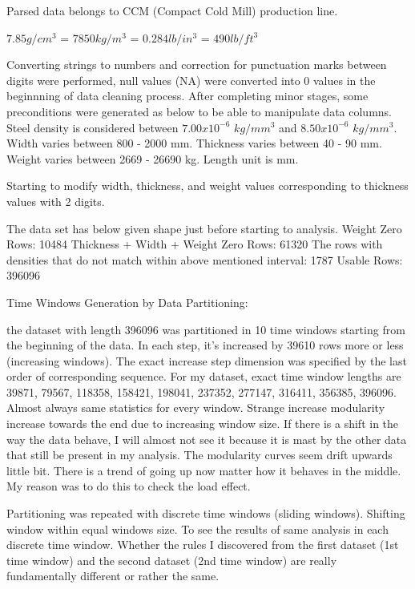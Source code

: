 \documentclass{article}
\begin{document}
Parsed data belongs to CCM (Compact Cold Mill) production line.

$7.85 g/cm^{3}$ = $7850 kg/m^{3}$ = $0.284 lb/in^{3}$ = $490 lb/ft^{3}$

Converting strings to numbers and correction for punctuation marks between digits were performed, null values (NA) were converted into $0$ values in the beginnning of data cleaning process. After completing minor stages, some preconditions were generated as below to be able to manipulate data columns.
Steel density is considered between $7.00 x 10^{-6}$ $kg/mm^{3}$ and $8.50x10^{-6}$ $kg/mm^{3}$.
Width varies between 800 - 2000 mm. 
Thickness varies between 40 - 90 mm. 
Weight varies between 2669 - 26690 kg.
Length unit is mm.

Starting to modify width, thickness, and weight values corresponding to thickness values with 2 digits.

The data set has below given shape just before starting to analysis.
Weight Zero Rows: 10484
Thickness + Width + Weight Zero Rows: 61320
The rows with densities that do not match within above mentioned interval: 1787
Usable Rows: 396096

Time Windows Generation by Data Partitioning:

the dataset with length 396096 was partitioned in 10 time windows starting from the beginning of the data. In each step, it's increased by 39610 rows more or less (increasing windows). The exact increase step dimension was specified by the last order of corresponding sequence. For my dataset, exact time window lengths are 39871, 79567, 118358, 158421, 198041, 237352, 277147, 316411, 356385, 396096. Almost always same statistics for every window. Strange increase modularity increase towards the end due to increasing window size. If there is a shift in the way the data behave, I will almost not see it because it is mast by the other data that still be present in my analysis. The modularity curves seem drift upwards little bit. There is a trend of going up now matter how it behaves in the middle. My reason was to do this to check the load effect.

Partitioning was repeated with discrete time windows (sliding windows). Shifting window within equal windows size. To see the results of same analysis in each discrete time window. Whether the rules I discovered from the first dataset (1st time window) and the second dataset (2nd time window) are really fundamentally different or rather the same.
\end{document}
